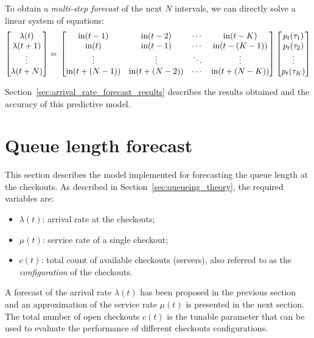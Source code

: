 To obtain a \emph{multi-step forecast} of the next \( N \) intervals, we can directly solve a linear system of equations:
\begin{equation}
  \begin{bmatrix}
    \lambda(t)   \\
    \lambda(t+1) \\
    \vdots       \\
    \lambda(t+N)
  \end{bmatrix} =  \\
  \begin{bmatrix}
    \text{in}(t-1)     & \text{in}(t-2)     & \cdots & \text{in}(t-K)     \\
    \text{in}(t)       & \text{in}(t-1)     & \cdots & \text{in}(t-(K-1)) \\
    \vdots             & \vdots             & \ddots & \vdots             \\
    \text{in}(t+(N-1)) & \text{in}(t+(N-2)) & \cdots & \text{in}(t+(N-K))
  \end{bmatrix}
  \begin{bmatrix}
    p_t(\tau_1) \\
    p_t(\tau_2) \\
    \vdots      \\
    p_t(\tau_K)
  \end{bmatrix}
\end{equation}

Section~\ref{sec:arrival_rate_forecast_results} describes the results obtained and the accuracy of this predictive model.

\section{Queue length forecast}
\label{sec:queue_length_forecast}

This section describes the model implemented for forecasting the queue length at the checkouts. As described in Section~\ref{sec:queueing_theory}, the required variables are:
\begin{itemize}
  \item \( \lambda(t) \): arrival rate at the checkouts;
  \item \( \mu(t) \): service rate of a single checkout;
  \item \( c(t) \): total count of available checkouts (servers), also referred to as the \emph{configuration} of the checkouts.
\end{itemize}

A forecast of the arrival rate \( \lambda(t) \) has been proposed in the previous section and an approximation of the service rate \( \mu(t) \) is presented in the next section. The total number of open checkouts \( c(t) \) is the tunable parameter that can be used to evaluate the performance of different checkouts configurations.

